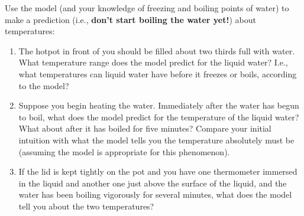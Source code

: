 \begin{benumerate}

	
	Use the model (and your knowledge of freezing and boiling points of water) to make a prediction (i.e., \textbf{don't start boiling the water yet!}) about temperatures:
	
	
	\begin{enumerate}
		\item The hotpot in front of you should be filled about two thirds full with water. What temperature range does the model predict for the liquid water? I.e., what temperatures can liquid water have before it freezes or boils, according to the model?
		
		\item Suppose you begin heating the water. Immediately after the water has begun to boil, what does the model predict for the temperature of the liquid water? What about after it has boiled for five minutes? Compare your initial intuition with what the model tells you the temperature absolutely must be (assuming the model is appropriate for this phenomenon).
		
		\item If the lid is kept tightly on the pot and you have one thermometer immersed in the liquid and another one just above the surface of the liquid, and the water has been boiling vigorously for several minutes, what does the model tell you about the two temperatures?

	\end{enumerate}
		

\end{benumerate}
